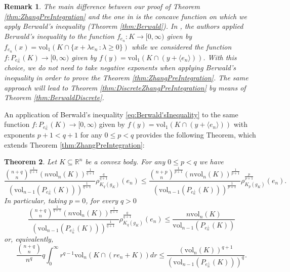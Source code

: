 \documentclass[10pt]{amsart}
\newtheorem{thm}{Theorem}[section]
\newtheorem{rmk}[thm]{Remark}
\def\R{\mathbb{R}}
\def\vol{\mathrm{vol}}
\numberwithin{equation}{section}
\begin{document}
\begin{rmk}
The main difference between our proof of Theorem \ref{thm:ZhangPreIntegration} and the one in \cite{GZ} is the concave function on which we apply Berwald's inequality (Theorem \ref{thm:Berwald}). In \cite{GZ}, the authors applied Berwald's inequality to the function $f_{e_n}:K\to[0,\infty)$ given by $f_{e_n}(x)=\vol_1(K\cap\{x+\lambda e_n\,:\lambda\geq0\})$ while we considered the function $f: P_{e_n^\perp}(K)\to[0,\infty)$ given by $f(y)=\vol_1(K\cap(y+\langle e_n\rangle))$. With this choice, we do not need to take negative exponents when applying Berwald's inequality  in order to prove the Theorem \ref{thm:ZhangPreIntegration}. The same approach will lead to Theorem \ref{thm:DiscreteZhangPreIntegration} by means of Theorem \ref{thm:BerwaldDiscrete}.
\end{rmk}

An application of Berwald's inequality \eqref{eq:Berwald'sInequality} to the same function $f: P_{e_n^\perp}(K)\to[0,\infty)$ given by $f(y)=\vol_1(K\cap(y+\langle e_n\rangle))$ with exponents $p+1<q+1$ for any $0\leq p<q$ provides the following Theorem, which extends Theorem \ref{thm:ZhangPreIntegration}:
\begin{thm}\label{thm:DifferentInclusion}
Let $K\subseteq\R^n$ be a convex body. For any $0\leq p<q$ we have
$$
\frac{{{n+q}\choose{n}}^\frac{1}{q+1}(n\vol_n(K))^\frac{1}{q+1}}{(\vol_{n-1}(P_{e_n^\perp}(K)))^\frac{1}{q+1}}\rho_{K_q(g_K)}^\frac{q}{q+1}(e_n)\leq
\frac{{{n+p}\choose{n}}^\frac{1}{p+1}(n\vol_n(K))^\frac{1}{p+1}}{(\vol_{n-1}(P_{e_n^\perp}(K)))^\frac{1}{p+1}}\rho_{K_p(g_K)}^\frac{p}{p+1}(e_n).
$$
In particular, taking $p=0$,  for every $q>0$
$$
\frac{{{n+q}\choose{n}}^\frac{1}{q+1}(n\vol_n(K))^\frac{1}{q+1}}{(\vol_{n-1}(P_{e_n^\perp}(K)))^\frac{1}{q+1}}\rho_{K_q(g_K)}^\frac{q}{q+1}(e_n)\leq
\frac{n\vol_n(K)}{\vol_{n-1}(P_{e_n^\perp}(K))}
$$
or, equivalently,
$$
\frac{{{n+q}\choose{n}}}{n^q}q\int_0^\infty r^{q-1}\vol_n(K\cap(re_n+K))dr\leq
\frac{(\vol_n(K))^{q+1}}{(\vol_{n-1}(P_{e_n^\perp}(K)))^q}.
$$
\end{thm}
\end{document}

